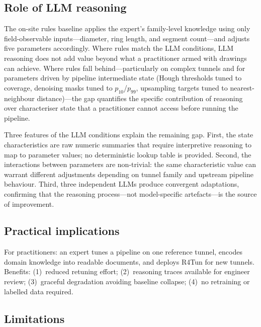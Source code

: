 \documentclass[a4paper,fleqn]{cas-dc}
\begin{document}
\subsection{Role of LLM reasoning}

The on-site rules baseline applies the expert's family-level knowledge using only field-observable inputs---diameter, ring length, and segment count---and adjusts five parameters accordingly. Where rules match the LLM conditions, LLM reasoning does not add value beyond what a practitioner armed with drawings can achieve. Where rules fall behind---particularly on complex tunnels and for parameters driven by pipeline intermediate state (Hough thresholds tuned to coverage, denoising masks tuned to $p_{10}$/$p_{99}$, upsampling targets tuned to nearest-neighbour distance)---the gap quantifies the specific contribution of reasoning over characteriser state that a practitioner cannot access before running the pipeline.

Three features of the LLM conditions explain the remaining gap. First, the state characteristics are raw numeric summaries that require interpretive reasoning to map to parameter values; no deterministic lookup table is provided. Second, the interactions between parameters are non-trivial: the same characteristic value can warrant different adjustments depending on tunnel family and upstream pipeline behaviour. Third, three independent LLMs produce convergent adaptations, confirming that the reasoning process---not model-specific artefacts---is the source of improvement.


\subsection{Practical implications}

For practitioners: an expert tunes a pipeline on one reference tunnel, encodes domain knowledge into readable documents, and deploys R4Tun for new tunnels. Benefits: (1)~reduced retuning effort; (2)~reasoning traces available for engineer review; (3)~graceful degradation avoiding baseline collapse; (4)~no retraining or labelled data required.

\subsection{Limitations}\label{sec:limitations}
\end{document}

